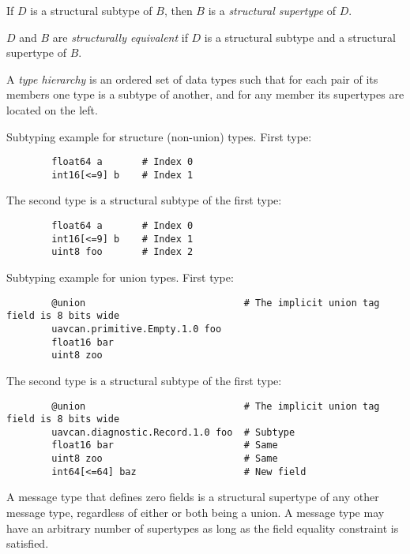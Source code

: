 If $D$ is a structural subtype of $B$, then $B$ is a \emph{structural supertype} of $D$.

$D$ and $B$ are \emph{structurally equivalent} if $D$ is a structural subtype and a structural supertype of $B$.

A \emph{type hierarchy} is an ordered set of data types such that for each pair of its members
one type is a subtype of another, and for any member its supertypes are located on the left.

\begin{remark}
    Subtyping example for structure (non-union) types. First type:

    \begin{verbatim}
        float64 a       # Index 0
        int16[<=9] b    # Index 1
    \end{verbatim}

    The second type is a structural subtype of the first type:

    \begin{verbatim}
        float64 a       # Index 0
        int16[<=9] b    # Index 1
        uint8 foo       # Index 2
    \end{verbatim}

    Subtyping example for union types. First type:

    \begin{verbatim}
        @union                            # The implicit union tag field is 8 bits wide
        uavcan.primitive.Empty.1.0 foo
        float16 bar
        uint8 zoo
    \end{verbatim}

    The second type is a structural subtype of the first type:

    \begin{verbatim}
        @union                            # The implicit union tag field is 8 bits wide
        uavcan.diagnostic.Record.1.0 foo  # Subtype
        float16 bar                       # Same
        uint8 zoo                         # Same
        int64[<=64] baz                   # New field
    \end{verbatim}

    A message type that defines zero fields is a structural supertype of any other message type, regardless of either
    or both being a union.
    A message type may have an arbitrary number of supertypes as long as the field equality constraint is satisfied.
\end{remark}

